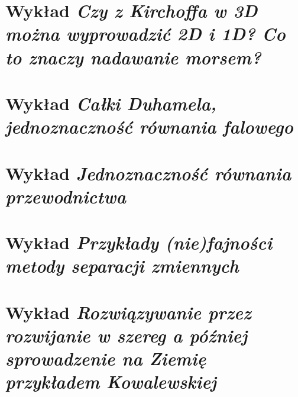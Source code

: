 \documentclass[a5paper, oneside]{memoir}
\begin{document}
\chapter{\textbf{Wykład }\textit{Czy z Kirchoffa w 3D można wyprowadzić 2D i 1D? Co to znaczy nadawanie morsem?}}

\chapter{\textbf{Wykład }\textit{Całki Duhamela, jednoznaczność równania falowego}}

\chapter{\textbf{Wykład }\textit{Jednoznaczność równania przewodnictwa}}

\chapter{\textbf{Wykład }\textit{Przykłady (nie)fajności metody separacji zmiennych}}

\chapter{\textbf{Wykład }\textit{Rozwiązywanie przez rozwijanie w szereg a później sprowadzenie na Ziemię przykładem Kowalewskiej}}

\end{document}
